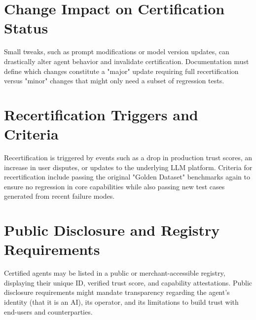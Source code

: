 \begin{TNtwocol}
\section{Change Impact on Certification Status}
Small tweaks, such as prompt modifications or model version updates, can drastically alter agent behavior and invalidate certification. Documentation must define which changes constitute a "major" update requiring full recertification versus "minor" changes that might only need a subset of regression tests.
\section{Recertification Triggers and Criteria}
Recertification is triggered by events such as a drop in production trust scores, an increase in user disputes, or updates to the underlying LLM platform. Criteria for recertification include passing the original "Golden Dataset" benchmarks again to ensure no regression in core capabilities while also passing new test cases generated from recent failure modes.
\section{Public Disclosure and Registry Requirements}
Certified agents may be listed in a public or merchant-accessible registry, displaying their unique ID, verified trust score, and capability attestations. Public disclosure requirements might mandate transparency regarding the agent's identity (that it is an AI), its operator, and its limitations to build trust with end-users and counterparties.
\end{TNtwocol}